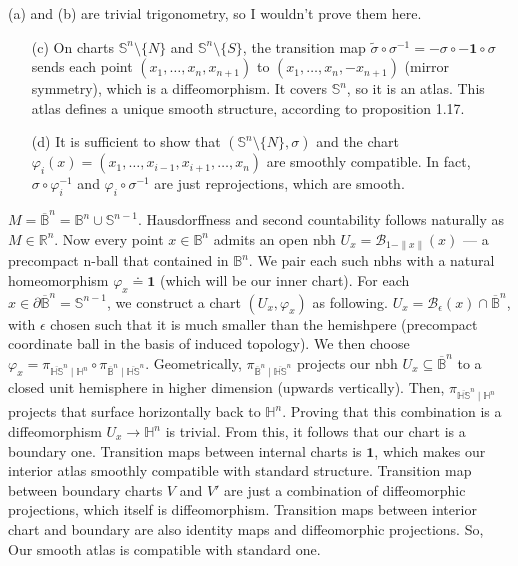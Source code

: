 \documentclass[a4paper]{article}
\begin{document}
\begin{exercise}[1-7]
(a) and (b) are trivial trigonometry, so I wouldn't prove them here.
\begin{enumerate}[topsep=0pt]
    \item[(c)] On charts $\mathbb{S}^n \setminus \{N\}$ and $\mathbb{S}^n \setminus \{S\}$,
        the transition map $\widetilde{\sigma} \circ \sigma^{-1} = -\sigma \circ -\boldsymbol{1} \circ \sigma$
        sends each point $(x_1, \ldots, x_n, x_{n+1})$ to $(x_1, \ldots, x_n, -x_{n+1})$ (mirror symmetry),
        which is a diffeomorphism. It covers $\mathbb{S}^n$, so it is an atlas.
        This atlas defines a unique smooth structure, according to proposition 1.17.
    \item[(d)] It is sufficient to show that $(\mathbb{S}^n \setminus \{N\}, \sigma)$ and
        the chart $\varphi_{i}(x) = (x_1, \dots, x_{i-1}, x_{i+1}, \dots, x_n)$
        are smoothly compatible. In fact, $\sigma \circ \varphi_i^{-1} $ and
        $\varphi_i \circ \sigma^{-1} $ are just reprojections, which are smooth.
\end{enumerate}
\end{exercise}

\begin{exercise}[1-11]
    $M = \overline{\mathbb{B}}^n = \mathbb{B}^n \cup \mathbb{S}^{n-1}$. Hausdorffness
    and second countability follows naturally as $M \in \mathbb{R}^n$. Now every
    point $x \in \mathbb{B}^n$ admits an open nbh $U_x = \mathcal{B}_{1-\|x\|}(x)$
    --- a precompact n-ball that contained in $\mathbb{B}^n$. We pair each such
    nbhs with a natural homeomorphism $\varphi_x \doteq \boldsymbol{1}$ (which
    will be our inner chart).
    For each $x \in \partial\overline{\mathbb{B}}^n = \mathbb{S}^{n-1}$, we construct a chart
    $(U_x, \varphi_x)$ as following. $U_x = \mathcal{B}_{\epsilon}(x) \cap \overline{\mathbb{B}}^n$,
    with $\epsilon$ chosen such that it is much smaller than the hemishpere (precompact coordinate ball in the basis of induced topology).
    We then choose $\varphi_x = \pi_{\overline{\mathbb{HS}}^{n} \mid \mathbb{H}^n} \circ \pi_{\overline{\mathbb{B}}^n \mid \overline{\mathbb{HS}}^n}$.
    Geometrically, $\pi_{\overline{\mathbb{B}}^n \mid \overline{\mathbb{HS}}^n}$ projects
    our nbh $U_x \subseteq \overline{\mathbb{B}}^n$ to a closed unit hemisphere in higher dimension
    (upwards vertically). Then, $\pi_{\overline{\mathbb{HS}}^{n} \mid \mathbb{H}^n}$
    projects that surface horizontally back to $\mathbb{H}^n$. Proving that this
    combination is a diffeomorphism $U_x \to \mathbb{H}^n$ is trivial. From this,
    it follows that our chart is a boundary one. Transition maps between internal
    charts is $\boldsymbol{1}$, which makes our interior atlas smoothly compatible
    with standard structure. Transition map between boundary charts $V$ and $V'$
    are just a combination of diffeomorphic projections, which itself is diffeomorphism.
    Transition maps between interior chart and boundary are also identity maps
    and diffeomorphic projections. So, Our smooth atlas is compatible with standard one.
\end{exercise}
\end{document}
